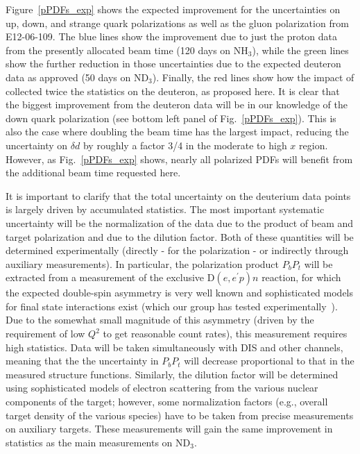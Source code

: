 Figure~\ref{pPDFs_exp} shows the expected improvement for the
uncertainties on up, down, and strange quark polarizations as well as the gluon 
polarization from E12-06-109. The blue lines show the improvement due to just the proton data 
from the presently allocated beam time (120 days on NH$_3$), while the green lines show the further reduction
in those uncertainties due to the expected deuteron data as approved (50 days on ND$_3$).
Finally, the red lines show how the impact of collected twice the statistics on the deuteron, as proposed here.
It is clear that the biggest improvement from the deuteron data will be in our knowledge of the down quark polarization
(see bottom left panel of Fig.~\ref{pPDFs_exp}). This is also the case where doubling the beam time has the largest
impact, reducing the uncertainty on $\delta d$ by roughly a factor 3/4 in the moderate to high $x$ region. However, as
Fig.~\ref{pPDFs_exp} shows, nearly all polarized PDFs will benefit from the additional beam time requested here.

It is important to clarify that the total uncertainty on the deuterium data points is largely driven by accumulated
statistics. The most important systematic uncertainty will be the normalization of the data due to the product of beam
and target polarization and due to the dilution factor. Both of these quantities will be determined 
experimentally (directly - for the polarization -
or indirectly through auxiliary measurements). In particular, the polarization product $P_b P_t$ will be extracted from a measurement of the exclusive
D$(e,e^\prime p)n$ reaction, for which the expected double-spin asymmetry is very well known and sophisticated models for final
state interactions exist (which our group has tested experimentally~\cite{Mayer}). Due to the somewhat small magnitude of this asymmetry
(driven by the requirement of low $Q^2$ to get reasonable count rates), this measurement requires high statistics. Data will be
taken simultaneously with DIS and other channels, meaning that the the uncertainty in $P_b P_t$ will decrease proportional to that
in the measured structure functions. Similarly, the dilution factor will be determined using sophisticated models of electron 
scattering from the various nuclear components of the target; however, some normalization factors (e.g., overall target density
of the various species) have to be taken from precise measurements on auxiliary targets. These measurements will gain
the same improvement in statistics as the main measurements on ND$_3$.


